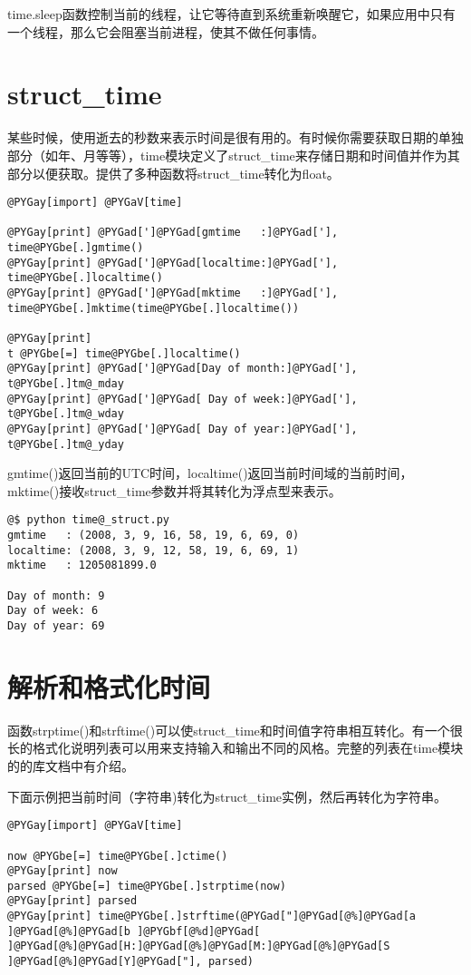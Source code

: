\documentclass[a4paper,10pt,english]{manual}
\begin{document}
time.sleep函数控制当前的线程，让它等待直到系统重新唤醒它，如果应用中只有一个线程，那么它会阻塞当前进程，使其不做任何事情。


\section{struct\_time}

某些时候，使用逝去的秒数来表示时间是很有用的。有时候你需要获取日期的单独部分（如年、月等等），time模块定义了struct\_time来存储日期和时间值并作为其部分以便获取。提供了多种函数将struct\_time转化为float。

\begin{Verbatim}[commandchars=@\[\]]
@PYGay[import] @PYGaV[time]

@PYGay[print] @PYGad[']@PYGad[gmtime   :]@PYGad['], time@PYGbe[.]gmtime()
@PYGay[print] @PYGad[']@PYGad[localtime:]@PYGad['], time@PYGbe[.]localtime()
@PYGay[print] @PYGad[']@PYGad[mktime   :]@PYGad['], time@PYGbe[.]mktime(time@PYGbe[.]localtime())

@PYGay[print]
t @PYGbe[=] time@PYGbe[.]localtime()
@PYGay[print] @PYGad[']@PYGad[Day of month:]@PYGad['], t@PYGbe[.]tm@_mday
@PYGay[print] @PYGad[']@PYGad[ Day of week:]@PYGad['], t@PYGbe[.]tm@_wday
@PYGay[print] @PYGad[']@PYGad[ Day of year:]@PYGad['], t@PYGbe[.]tm@_yday
\end{Verbatim}

gmtime()返回当前的UTC时间，localtime()返回当前时间域的当前时间，mktime()接收struct\_time参数并将其转化为浮点型来表示。

\begin{Verbatim}[commandchars=@\[\]]
@$ python time@_struct.py
gmtime   : (2008, 3, 9, 16, 58, 19, 6, 69, 0)
localtime: (2008, 3, 9, 12, 58, 19, 6, 69, 1)
mktime   : 1205081899.0

Day of month: 9
Day of week: 6
Day of year: 69
\end{Verbatim}


\section{解析和格式化时间}

函数strptime()和strftime()可以使struct\_time和时间值字符串相互转化。有一个很长的格式化说明列表可以用来支持输入和输出不同的风格。完整的列表在time模块的的库文档中有介绍。

下面示例把当前时间（字符串)转化为struct\_time实例，然后再转化为字符串。

\begin{Verbatim}[commandchars=@\[\]]
@PYGay[import] @PYGaV[time]

now @PYGbe[=] time@PYGbe[.]ctime()
@PYGay[print] now
parsed @PYGbe[=] time@PYGbe[.]strptime(now)
@PYGay[print] parsed
@PYGay[print] time@PYGbe[.]strftime(@PYGad["]@PYGad[@%]@PYGad[a ]@PYGad[@%]@PYGad[b ]@PYGbf[@%d]@PYGad[ ]@PYGad[@%]@PYGad[H:]@PYGad[@%]@PYGad[M:]@PYGad[@%]@PYGad[S ]@PYGad[@%]@PYGad[Y]@PYGad["], parsed)
\end{Verbatim}
\end{document}
